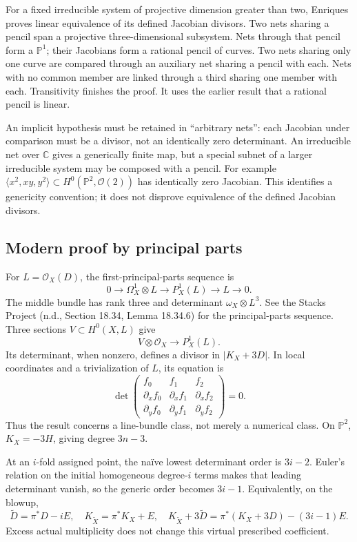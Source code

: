 For a fixed irreducible system of projective dimension greater than two, Enriques proves linear equivalence of its defined Jacobian divisors. Two nets sharing a pencil span a projective three-dimensional subsystem. Nets through that pencil form a \(\mathbb{P}^1\); their Jacobians form a rational pencil of curves. Two nets sharing only one curve are compared through an auxiliary net sharing a pencil with each. Nets with no common member are linked through a third sharing one member with each. Transitivity finishes the proof. It uses the earlier result that a rational pencil is linear.

An implicit hypothesis must be retained in ``arbitrary nets'': each Jacobian under comparison must be a divisor, not an identically zero determinant. An irreducible net over \(\mathbb C\) gives a generically finite map, but a special subnet of a larger irreducible system may be composed with a pencil. For example \(\langle x^2,xy,y^2\rangle\subset H^0(\mathbb{P}^2,\mathcal O(2))\) has identically zero Jacobian. This identifies a genericity convention; it does not disprove equivalence of the defined Jacobian divisors.

\subsection{Modern proof by principal parts}

For \(L=\mathcal O_X(D)\), the first-principal-parts sequence is \[
0\longrightarrow\Omega_X^1\otimes L\longrightarrow P_X^1(L)
\longrightarrow L\longrightarrow0.
\] The middle bundle has rank three and determinant \(\omega_X\otimes L^3\). See the Stacks Project (n.d., Section 18.34, Lemma 18.34.6) for the principal-parts sequence. Three sections \(V\subset H^0(X,L)\) give \[
V\otimes\mathcal O_X\longrightarrow P_X^1(L).
\] Its determinant, when nonzero, defines a divisor in \(|K_X+3D|\). In local coordinates and a trivialization of \(L\), its equation is \[
\det\begin{pmatrix}
f_0&f_1&f_2\\
\partial_x f_0&\partial_x f_1&\partial_x f_2\\
\partial_y f_0&\partial_y f_1&\partial_y f_2
\end{pmatrix}=0.
\] Thus the result concerns a line-bundle class, not merely a numerical class. On \(\mathbb{P}^2\), \(K_X=-3H\), giving degree \(3n-3\).

At an \(i\)-fold assigned point, the naïve lowest determinant order is \(3i-2\). Euler's relation on the initial homogeneous degree-\(i\) terms makes that leading determinant vanish, so the generic order becomes \(3i-1\). Equivalently, on the blowup, \[
\widetilde D=\pi^*D-iE,\quad
K_{\widetilde X}=\pi^*K_X+E,\quad
K_{\widetilde X}+3\widetilde D=\pi^*(K_X+3D)-(3i-1)E.
\] Excess actual multiplicity does not change this virtual prescribed coefficient.

